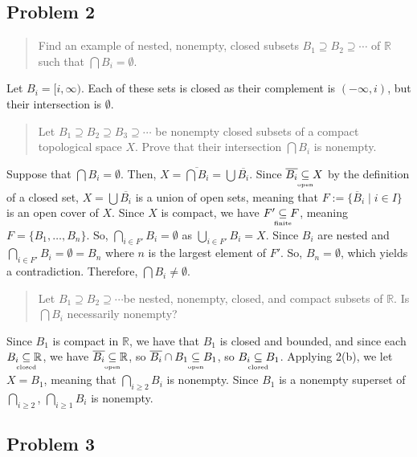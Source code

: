 \documentclass[8pt]{extarticle}
\newcommand{\open}{\underset{\clap{\tiny open}}{\subseteq}}
\newcommand{\closed}{\underset{\clap{\tiny closed}}{\subseteq}}
\newcommand{\finite}{\underset{\clap{\tiny finite}}{\subseteq}}
\begin{document}
{\subsection*{Problem 2}%

\begin{quote}
	Find an example of nested, nonempty, closed subsets $B_{1}\supseteq B_{2}\supseteq\cdots$ of $\mathbb{R}$ such that $\bigcap B_{i} = \emptyset$.
\end{quote}
Let $B_{i} = [i,\infty)$. Each of these sets is closed as their complement is $(-\infty,i)$, but their intersection is $\emptyset$.
\begin{quote}
	Let $B_{1}\supseteq B_{2}\supseteq B_{3}\supseteq\cdots$ be nonempty closed subsets of a compact topological space $X$. Prove that their intersection $\bigcap B_{i}$ is nonempty.
\end{quote}
Suppose that $\bigcap B_{i} = \emptyset$. Then, $X = \overline{\bigcap B_{i}} = \bigcup\overline{B_{i}}$. Since $\overline{B_{i}}\open X$ by the definition of a closed set, $X = \bigcup\overline{B_{i}}$ is a union of open sets, meaning that $F:=\{\overline B_{i}\mid i\in I\}$ is an open cover of $X$. Since $X$ is compact, we have $F'\finite F$, meaning $F = \{B_{1},\dots,B_{n}\}$. So, $\bigcap_{i\in F'}B_{i} = \emptyset$ as $\bigcup_{i\in F'}B_{i} = X$. Since $B_{i}$ are nested and $\bigcap_{i\in F'} B_{i} = \emptyset = B_{n}$ where $n$ is the largest element of $F'$. So, $B_{n} = \emptyset$, which yields a contradiction. Therefore, $\bigcap B_{i} \neq \emptyset$.
\begin{quote}
	Let $B_{1}\supseteq B_{2}\supseteq \cdots $be nested, nonempty, closed, and compact subsets of $\mathbb{R}$. Is $\bigcap B_{i}$ necessarily nonempty?
\end{quote}
Since $B_1$ is compact in $\mathbb{R}$, we have that $B_1$ is closed and bounded, and since each $B_i\closed \mathbb{R}$, we have $\overline{B_i}\open \mathbb{R}$, so $\overline{B_{i}}\cap B_{1}\open B_{1}$, so $B_{i}\closed B_{1}$. Applying 2(b), we let $X = B_1$, meaning that $\bigcap_{i\geq 2} B_{i}$ is nonempty. Since $B_1$ is a nonempty superset of $\bigcap_{i\geq 2}$, $\bigcap_{i\geq 1}B_{i}$ is nonempty.
\subsection*{Problem 3}%

}
\end{document}
